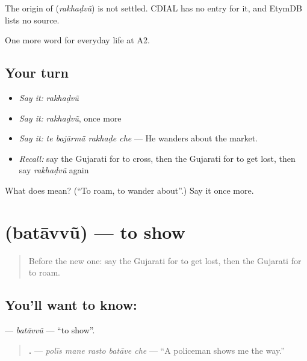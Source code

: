 \begin{cousinweb}
The origin of \textbf{} (\emph{rakhaḍvũ}) is not settled. CDIAL has no entry for it, and EtymDB lists no source.
\end{cousinweb}

\begin{grammarlens}[title={What you've built}]
One more word for everyday life at A2.
\end{grammarlens}

\subsection*{Your turn}
\begin{itemize}
\raggedright
  \item \emph{Say it:} \emph{rakhaḍvũ}
  \item \emph{Say it:} \emph{rakhaḍvũ}, once more
  \item \emph{Say it:} \emph{te bajārmā̃ rakhaḍe che} — He wanders about the market.
  \item \emph{Recall:} say the Gujarati for to cross, then the Gujarati for to get lost, then say \emph{rakhaḍvũ} again
\end{itemize}

\begin{tcolorbox}[breakable,colback=teal!4,colframe=teal!35!black,title={Before you move on}]
What does  mean? (\textquotedblleft{}To roam, to wander about\textquotedblright{}.) Say it once more.
\end{tcolorbox}
\section[\texorpdfstring{\gu{બતાવવું} (batāvvũ)}{બતાવવું (batāvvũ)}]{ (batāvvũ) — to show}

\label{lesson:GU-C195-batavvu}



\begin{quote}
Before the new one: say the Gujarati for to get lost, then the Gujarati for to roam.
\end{quote}

\subsection*{You'll want to know: }
\textbf{} — \emph{batāvvũ} — \textquotedblleft{}to show\textquotedblright{}.

\begin{quote}
\textbf{    .} — \emph{polīs mane rasto batāve che} — \textquotedblleft{}A policeman shows me the way.\textquotedblright{}
\end{quote}

